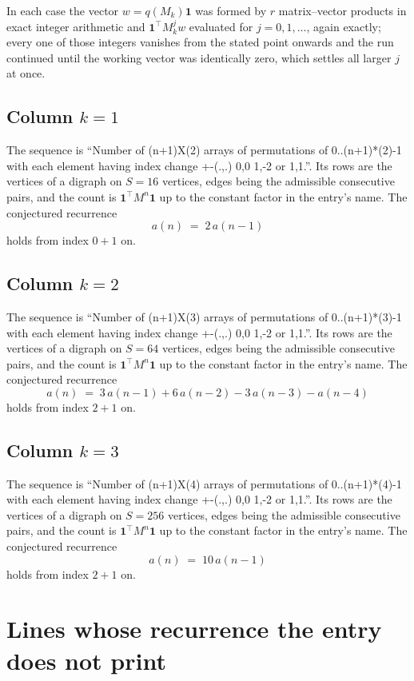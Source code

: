 \documentclass[11pt,a4paper]{article}
\theoremstyle{plain}
\theoremstyle{definition}
\begin{document}
In each case the vector $w=q(M_k)\mathbf{1}$ was formed by $r$ matrix--vector products in
exact integer arithmetic and $\mathbf{1}^{\!\top}M_k^{j}w$ evaluated for $j=0,1,\dots$,
again exactly; every one of those integers vanishes from the stated point onwards and the run
continued until the working vector was identically zero, which settles all larger $j$ at once.

\subsection*{Column $k$$=1$}
The sequence is ``Number of (n+1)X(2) arrays of permutations of 0..(n+1)*(2)-1 with each element having index change +-(.,.) 0,0 1,-2 or 1,1.''. Its rows are the vertices of a digraph on
$S=16$ vertices, edges being the admissible consecutive pairs, and the count is
$\mathbf{1}^{\!\top}M^{n}\mathbf{1}$ up to the constant factor in the entry's name.
The conjectured recurrence
\[
a(n)\;=\;2\,a(n-1)
\]
holds from index $0+1$ on.

\subsection*{Column $k$$=2$}
The sequence is ``Number of (n+1)X(3) arrays of permutations of 0..(n+1)*(3)-1 with each element having index change +-(.,.) 0,0 1,-2 or 1,1.''. Its rows are the vertices of a digraph on
$S=64$ vertices, edges being the admissible consecutive pairs, and the count is
$\mathbf{1}^{\!\top}M^{n}\mathbf{1}$ up to the constant factor in the entry's name.
The conjectured recurrence
\[
a(n)\;=\;3\,a(n-1) + 6\,a(n-2) - 3\,a(n-3) - a(n-4)
\]
holds from index $2+1$ on.

\subsection*{Column $k$$=3$}
The sequence is ``Number of (n+1)X(4) arrays of permutations of 0..(n+1)*(4)-1 with each element having index change +-(.,.) 0,0 1,-2 or 1,1.''. Its rows are the vertices of a digraph on
$S=256$ vertices, edges being the admissible consecutive pairs, and the count is
$\mathbf{1}^{\!\top}M^{n}\mathbf{1}$ up to the constant factor in the entry's name.
The conjectured recurrence
\[
a(n)\;=\;10\,a(n-1)
\]
holds from index $2+1$ on.


\section{Lines whose recurrence the entry does not print}
\end{document}
